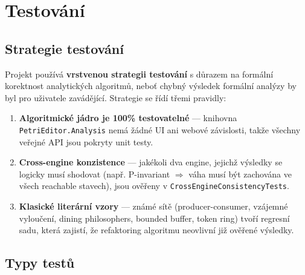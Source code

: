 \documentclass[12pt,a4paper]{article}
\begin{document}
\section{Testování}
\label{sec:tests}

\subsection{Strategie testování}

Projekt používá \textbf{vrstvenou strategii testování} s důrazem na
formální korektnost analytických algoritmů, neboť chybný výsledek formální
analýzy by byl pro uživatele zavádějící. Strategie se řídí třemi pravidly:

\begin{enumerate}
    \item \textbf{Algoritmické jádro je 100\% testovatelné} — knihovna
          \texttt{PetriEditor.Analysis} nemá žádné UI ani webové
          závislosti, takže všechny veřejné API jsou pokryty unit testy.
    \item \textbf{Cross-engine konzistence} — jakékoli dva engine,
          jejichž výsledky se logicky musí shodovat (např. P-invariant
          $\Rightarrow$ váha musí být zachována ve všech reachable stavech),
          jsou ověřeny v \texttt{CrossEngineConsistencyTests}.
    \item \textbf{Klasické literární vzory} — známé sítě
          (producer-consumer, vzájemné vyloučení, dining philosophers,
          bounded buffer, token ring) tvoří regresní sadu, která zajistí,
          že refaktoring algoritmu neovlivní již ověřené výsledky.
\end{enumerate}

\subsection{Typy testů}
\end{document}
